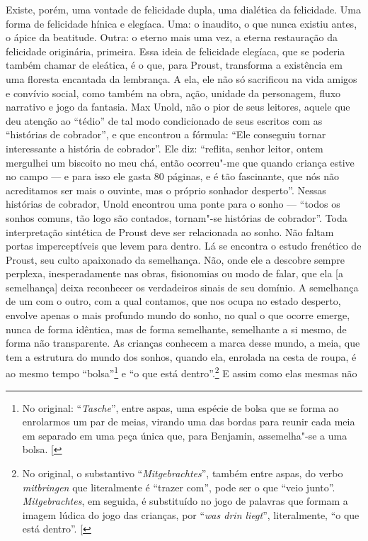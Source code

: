 Existe, porém, uma vontade de felicidade dupla, uma dialética da
felicidade. Uma forma de felicidade hínica e elegíaca. Uma: o inaudito,
o que nunca existiu antes, o ápice da beatitude. Outra: o eterno mais
uma vez, a eterna restauração da felicidade originária, primeira. Essa
ideia de felicidade elegíaca, que se poderia também chamar de eleática,
é o que, para Proust, transforma a existência em uma floresta encantada
da lembrança. A ela, ele não só sacrificou na vida amigos e convívio
social, como também na obra, ação, unidade da personagem, fluxo
narrativo e jogo da fantasia. Max Unold, não o pior de seus leitores,
aquele que deu atenção ao ``tédio'' de tal modo condicionado de seus
escritos com as ``histórias de cobrador'', e que encontrou a fórmula:
``Ele conseguiu tornar interessante a história de cobrador''. Ele diz:
``reflita, senhor leitor, ontem mergulhei um biscoito no meu chá, então
ocorreu"-me que quando criança estive no campo --- e para isso ele gasta 80
páginas, e é tão fascinante, que nós não acreditamos ser mais o ouvinte,
mas o próprio sonhador desperto''. Nessas histórias de cobrador, Unold
encontrou uma ponte para o sonho --- ``todos os sonhos comuns, tão logo
são contados, tornam"-se histórias de cobrador''. Toda interpretação
sintética de Proust deve ser relacionada ao sonho. Não faltam portas
imperceptíveis que levem para dentro. Lá se encontra o estudo frenético
de Proust, seu culto apaixonado da semelhança. Não, onde ele a descobre
sempre perplexa, inesperadamente nas obras, fisionomias ou modo de
falar, que ela {[}a semelhança{]} deixa reconhecer os verdadeiros sinais
de seu domínio. A semelhança de um com o outro, com a qual contamos, que
nos ocupa no estado desperto, envolve apenas o mais profundo mundo do
sonho, no qual o que ocorre emerge, nunca de forma idêntica, mas de
forma semelhante, semelhante a si mesmo, de forma não transparente. As
crianças conhecem a marca desse mundo, a meia, que tem a estrutura do
mundo dos sonhos, quando ela, enrolada na cesta de roupa, é ao mesmo
tempo ``bolsa''\footnote{No original: ``\emph{Tasche}'', entre aspas, uma espécie de bolsa que se forma ao enrolarmos um par de meias, virando uma das bordas para reunir cada meia em separado em uma peça única que, para Benjamin, assemelha"-se a uma bolsa. {[}\versal{N.~T.}{]}} e ``o que está dentro''.\footnote{No original, o substantivo ``\emph{Mitgebrachtes}'', também entre aspas, do verbo \emph{mitbringen} que literalmente é ``trazer com'', pode ser o que ``veio junto''. \emph{Mitgebrachtes}, em seguida, é substituído no jogo de palavras que formam a imagem lúdica do jogo das crianças, por ``\emph{was drin liegt}'', literalmente, ``o que está dentro''. {[}\versal{N.~T.}{]}} E assim como elas mesmas não
